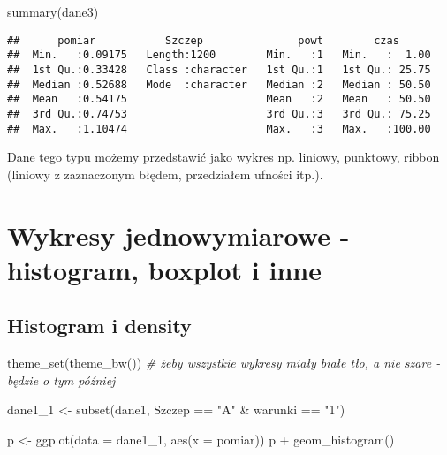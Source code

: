\documentclass[
]{book}
\newenvironment{Shaded}{\begin{snugshade}}{\end{snugshade}}
\newcommand{\AttributeTok}[1]{\textcolor[rgb]{0.77,0.63,0.00}{#1}}
\newcommand{\CommentTok}[1]{\textcolor[rgb]{0.56,0.35,0.01}{\textit{#1}}}
\newcommand{\FunctionTok}[1]{\textcolor[rgb]{0.00,0.00,0.00}{#1}}
\newcommand{\NormalTok}[1]{#1}
\newcommand{\OtherTok}[1]{\textcolor[rgb]{0.56,0.35,0.01}{#1}}
\newcommand{\SpecialCharTok}[1]{\textcolor[rgb]{0.00,0.00,0.00}{#1}}
\newcommand{\StringTok}[1]{\textcolor[rgb]{0.31,0.60,0.02}{#1}}
\begin{document}
\begin{Shaded}
\begin{Highlighting}[]
\FunctionTok{summary}\NormalTok{(dane3)}
\end{Highlighting}
\end{Shaded}

\begin{verbatim}
##      pomiar           Szczep               powt        czas       
##  Min.   :0.09175   Length:1200        Min.   :1   Min.   :  1.00  
##  1st Qu.:0.33428   Class :character   1st Qu.:1   1st Qu.: 25.75  
##  Median :0.52688   Mode  :character   Median :2   Median : 50.50  
##  Mean   :0.54175                      Mean   :2   Mean   : 50.50  
##  3rd Qu.:0.74753                      3rd Qu.:3   3rd Qu.: 75.25  
##  Max.   :1.10474                      Max.   :3   Max.   :100.00
\end{verbatim}

Dane tego typu możemy przedstawić jako wykres np. liniowy, punktowy, ribbon (liniowy z zaznaczonym błędem, przedziałem ufności itp.).

\hypertarget{wykresy-jednowymiarowe---histogram-boxplot-i-inne}{%
\section{Wykresy jednowymiarowe - histogram, boxplot i inne}\label{wykresy-jednowymiarowe---histogram-boxplot-i-inne}}

\hypertarget{histogram-i-density}{%
\subsection{Histogram i density}\label{histogram-i-density}}

\begin{Shaded}
\begin{Highlighting}[]
\FunctionTok{theme\_set}\NormalTok{(}\FunctionTok{theme\_bw}\NormalTok{()) }\CommentTok{\# żeby wszystkie wykresy miały białe tło, a nie szare {-} będzie o tym później}

\NormalTok{dane1\_1 }\OtherTok{\textless{}{-}} \FunctionTok{subset}\NormalTok{(dane1, Szczep }\SpecialCharTok{==} \StringTok{"A"} \SpecialCharTok{\&}\NormalTok{ warunki }\SpecialCharTok{==} \StringTok{"1"}\NormalTok{)}

\NormalTok{p }\OtherTok{\textless{}{-}} \FunctionTok{ggplot}\NormalTok{(}\AttributeTok{data =}\NormalTok{ dane1\_1, }\FunctionTok{aes}\NormalTok{(}\AttributeTok{x =}\NormalTok{ pomiar))}
\NormalTok{p }\SpecialCharTok{+} \FunctionTok{geom\_histogram}\NormalTok{()}
\end{Highlighting}
\end{Shaded}
\end{document}
